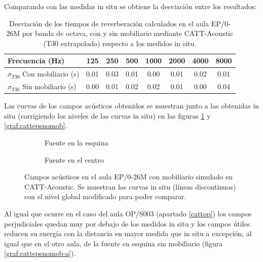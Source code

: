 Comparando con las medidas in situ se obtiene la desviación entre los resultados:

\begin{table}[ht]
\centering
{
\begin{tabular}{@{}lccccccc@{}}
\toprule
Frecuencia (Hz) & 125 & 250 & 500 & 1000 & 2000 & 4000 & 8000 \\ \midrule
$\sigma_{T30}$ Con mobiliario (s) & 0.01 & 0.03 & 0.01 & 0.00 & 0.01 & 0.02 & 0.01 \\
$\sigma_{T30}$ Sin mobiliario (s) & 0.00 & 0.01 & 0.02 & 0.02 & 0.01 & 0.00 & 0.04 \\ \bottomrule
\end{tabular}
}
\caption{Desviación de los tiempos de reverberación calculados en el aula EP/0-26M por banda de octava, con y sin mobiliario mediante CATT-Acoustic (T30 extrapolado) respecto a los medidos in situ.}
\label{tab:desrevepscatt}
\vspace{-0.3cm}
\end{table}
\FloatBarrier

Las curvas de los campos acústicos obtenidos se muestran junto a las obtenidas in situ (corrigiendo los niveles de las curvas in situ) en las figuras \ref{graf:cattepsmob} y \ref{graf:cattepsnomob}.

\begin{figure}[ht]
    \begin{subfigure}[b]{0.4\textwidth}
    	\centering%
         {%
    }
    \caption{Fuente en la esquina}%
    \end{subfigure}%
    \hspace{1.9cm}%
    \begin{subfigure}[b]{0.4\textwidth}%
    	\centering%
        {%
    }
    \caption{Fuente en el centro}%
    \end{subfigure}
    \caption{Campos acústicos en el aula EP/0-26M con mobiliario simulado en CATT-Acoustic. Se muestran las curvas in situ (líneas discontinuas) con el nivel global modificado para poder comparar.}
    \label{graf:cattepsmob}%
    \vspace{-0.3cm}%
\end{figure}
\FloatBarrier

Al igual que ocurre en el caso del aula OP/S003 (apartado \ref{cattop}) los campos perjudiciales quedan muy por debajo de los medidos in situ y los campos útiles reducen su energía con la distancia en mayor medida que in situ a excepción, al igual que en el otro aula, de la fuente en esquina sin mobiliario (figura \ref{graf:cattepsnomob-a}).

